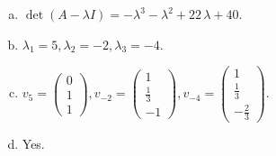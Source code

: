 \begin{questions}
\begin{solution}
\begin{enumerate}[(a)]
\item $\det(A-\lambda I)=-{\lambda}^{3} - {\lambda}^{2} + 22 \, {\lambda} + 40$.
\item ${\lambda}_1=5, {\lambda}_2=-2, {\lambda}_3=-4$.
\item $v_{5}=\left(\begin{array}{r}
0 \\
1 \\
1
\end{array}\right), v_{-2}=\left(\begin{array}{r}
1 \\
\frac{1}{3} \\
-1
\end{array}\right), v_{-4}=\left(\begin{array}{r}
1 \\
\frac{1}{3} \\
-\frac{2}{3}
\end{array}\right)$.
\item Yes.
\end{enumerate}
\end{solution}

\end{questions}

\newpage


\begin{center}
\end{center}

